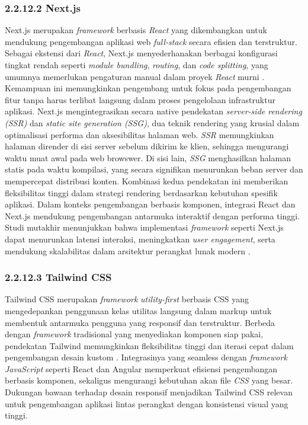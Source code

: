 \subsubsection{2.2.12.2 Next.js}
Next.js merupakan \emph{framework} berbasis \emph{React} yang dikembangkan untuk mendukung pengembangan aplikasi web \emph{full-stack} secara efisien dan terstruktur. Sebagai ekstensi dari \emph{React}, Next.js menyederhanakan berbagai konfigurasi tingkat rendah seperti \emph{module bundling}, \emph{routing}, dan \emph{code splitting}, yang umumnya memerlukan pengaturan manual dalam proyek \emph{React} murni \cite{Nextjs2024}. Kemampuan ini memungkinkan pengembang untuk fokus pada pengembangan fitur tanpa harus terlibat langsung dalam proses pengelolaan infrastruktur aplikasi. Next.js mengintegrasikan secara native pendekatan \emph{server-side rendering (SSR)} dan \emph{static site generation (SSG)}, dua teknik rendering yang krusial dalam optimalisasi performa dan aksesibilitas halaman web. \emph{SSR} memungkinkan halaman dirender di sisi server sebelum dikirim ke klien, sehingga mengurangi waktu muat awal pada web browswer. Di sisi lain, \emph{SSG} menghasilkan halaman statis pada waktu kompilasi, yang secara signifikan menurunkan beban server dan mempercepat distribusi konten. Kombinasi kedua pendekatan ini memberikan fleksibilitas tinggi dalam strategi rendering berdasarkan kebutuhan spesifik aplikasi. Dalam konteks pengembangan berbasis komponen, integrasi React dan Next.js mendukung pengembangan antarmuka interaktif dengan performa tinggi. Studi mutakhir menunjukkan bahwa implementasi \emph{framework} seperti Next.js dapat menurunkan latensi interaksi, meningkatkan \emph{user engagement}, serta mendukung skalabilitas dalam arsitektur perangkat lunak modern \cite{Nextjs2024}.

\subsubsection{2.2.12.3 Tailwind CSS}

Tailwind CSS merupakan \emph{framework} \emph{utility-first} berbasis CSS yang mengedepankan penggunaan kelas utilitas langsung dalam markup untuk membentuk antarmuka pengguna yang responsif dan terstruktur. Berbeda dengan \emph{framework} tradisional yang menyediakan komponen siap pakai, pendekatan Tailwind memungkinkan fleksibilitas tinggi dan iterasi cepat dalam pengembangan desain kustom \cite{Azhariyah2024}. Integrasinya yang seamless dengan \emph{framework JavaScript} seperti React dan Angular memperkuat efisiensi pengembangan berbasis komponen, sekaligus mengurangi kebutuhan akan file \emph{CSS} yang besar. Dukungan bawaan terhadap desain responsif menjadikan Tailwind CSS relevan untuk pengembangan aplikasi lintas perangkat dengan konsistensi visual yang tinggi.

